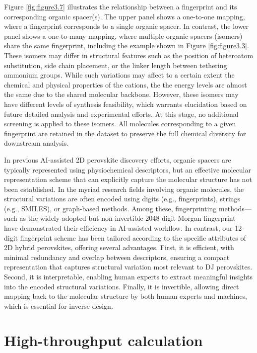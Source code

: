Figure \ref{fig:figure3.7} illustrates the relationship between a fingerprint and its corresponding organic spacer(s). The upper panel shows a one-to-one mapping, where a fingerprint corresponds to a single organic spacer. In contrast, the lower panel shows a one-to-many mapping, where multiple organic spacers (isomers) share the same fingerprint, including the example shown in Figure \ref{fig:figure3.3}. These isomers may differ in structural features such as the position of heteroatom substitution, side chain placement, or the linker length between tethering ammonium groups. While such variations may affect to a certain extent the chemical and physical properties of the cations, the the energy levels are almost the same due to the shared molecular backbone. However, these isomers may have different levels of synthesis feasibility, which warrants elucidation based on future detailed analysis and experimental efforts. At this stage, no additional screening is applied to these isomers. All molecules corresponding to a given fingerprint are retained in the dataset to preserve the full chemical diversity for downstream analysis.

In previous AI-assisted 2D perovskite discovery efforts, organic spacers are typically represented using physiochemical descriptors\cite{RN315,RN283}, but an effective molecular representation scheme that can explicitly capture the molecular structure has not been established. In the myriad research fields involving organic molecules, the structural variations are often encoded using digits (e.g., fingerprints), strings (e.g., SMILES), or graph-based methods\cite{RN361}. Among these, fingerprinting methods—such as the widely adopted but non-invertible 2048-digit Morgan fingerprint—have demonstrated their efficiency in AI-assisted workflow\cite{RN610,RN549}. In contrast, our 12-digit fingerprint scheme has been tailored according to the specific attributes of 2D hybrid perovskites, offering several advantages. First, it is efficient, with minimal redundancy and overlap between descriptors, ensuring a compact representation that captures structural variation most relevant to DJ perovskites. Second, it is interpretable, enabling human experts to extract meaningful insights into the encoded structural variations. Finally, it is invertible, allowing direct mapping back to the molecular structure by both human experts and machines, which is essential for inverse design.

\section{High-throughput calculation}\label{section:section3-3}

